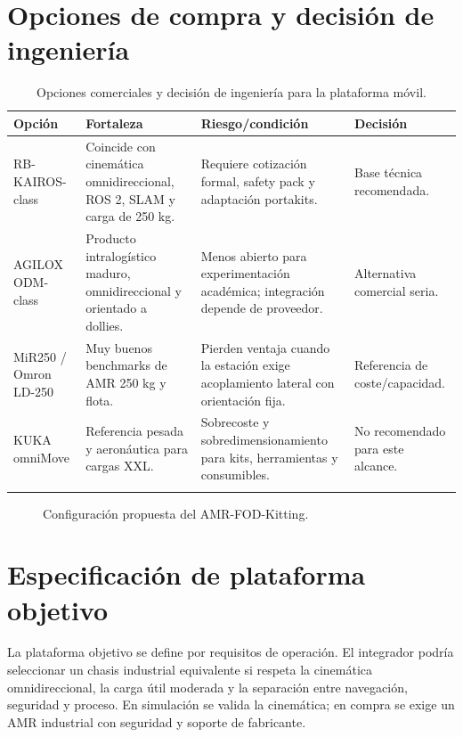 \section{Opciones de compra y decisión de ingeniería}

\begin{longtable}{P{0.22\textwidth}P{0.23\textwidth}P{0.25\textwidth}P{0.20\textwidth}}
\toprule
Opción & Fortaleza & Riesgo/condición & Decisión\\
\midrule
\endhead
RB-KAIROS-class & Coincide con cinemática omnidireccional, ROS 2, SLAM y carga de 250 kg. & Requiere cotización formal, safety pack y adaptación portakits. & Base técnica recomendada.\\
AGILOX ODM-class & Producto intralogístico maduro, omnidireccional y orientado a dollies. & Menos abierto para experimentación académica; integración depende de proveedor. & Alternativa comercial seria.\\
MiR250 / Omron LD-250 & Muy buenos benchmarks de AMR 250 kg y flota. & Pierden ventaja cuando la estación exige acoplamiento lateral con orientación fija. & Referencia de coste/capacidad.\\
KUKA omniMove & Referencia pesada y aeronáutica para cargas XXL. & Sobrecoste y sobredimensionamiento para kits, herramientas y consumibles. & No recomendado para este alcance.\\
\bottomrule
\caption{Opciones comerciales y decisión de ingeniería para la plataforma móvil.}
\label{tab:opciones-compra}
\end{longtable}

\begin{figure}[H]
\centering

\caption{Configuración propuesta del AMR-FOD-Kitting.}
\label{fig:robot-payload}
\end{figure}

\section{Especificación de plataforma objetivo}

La plataforma objetivo se define por requisitos de operación. El integrador podría seleccionar un chasis industrial equivalente si respeta la cinemática omnidireccional, la carga útil moderada y la separación entre navegación, seguridad y proceso. En simulación se valida la cinemática; en compra se exige un AMR industrial con seguridad y soporte de fabricante.

